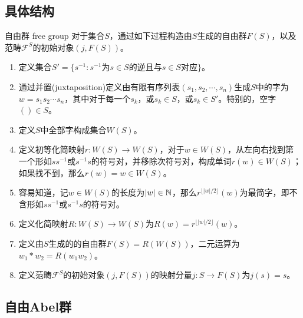 \subsection{具体结构}

\begin{definition}{自由群 free group}
	对于集合$S$，通过如下过程构造由$S$生成的自由群$F(S)$，以及范畴$\mathscr{F}^S$的初始对象$(j,F(S))$。
	\begin{enumerate}
		\item 定义集合$S'=\{ s^{-1}:s^{-1} \text{为} s \in S \text{的逆且与} s\in S \text{对应}\}$。
		\item 通过并置(juxtaposition)定义由有限有序列表$(s_1,s_2,\cdots,s_n)$生成$S$中的字为$w=s_1s_2\cdots s_n$，其中对于每一个$s_k$，或$s_k\in S$，或$s_k\in S'$。特别的，空字$()\in S$。
		\item 定义$S$中全部字构成集合$W(S)$。
		\item 定义初等化简映射$r:W(S)\to W(S)$，对于$w\in W(S)$，从左向右找到第一个形如$ss^{-1}$或$s^{-1}s$的符号对，并移除次符号对，构成单词$r(w)\in W(S)$；如果找不到，那么$r(w)=w\in W(S)$。
		\item 容易知道，记$w\in W(S)$的长度为$|w|\in\mathbb{N}$，那么$r^{\lfloor |w|/2 \rfloor}(w)$为最简字，即不含形如$ss^{-1}$或$s^{-1}s$的符号对。
		\item 定义化简映射$R:W(S)\to W(S)$为$R(w)=r^{\lfloor |w|/2 \rfloor}(w)$。
		\item 定义由$S$生成的的自由群$F(S)=R(W(S))$，二元运算为$w_1*w_2=R(w_1w_2)$。
		\item  定义范畴$\mathscr{F}^S$的初始对象$(j,F(S))$的映射分量$j:S\to F(S)$为$j(s)=s$。
	\end{enumerate}
\end{definition}

\subsection{自由Abel群}

